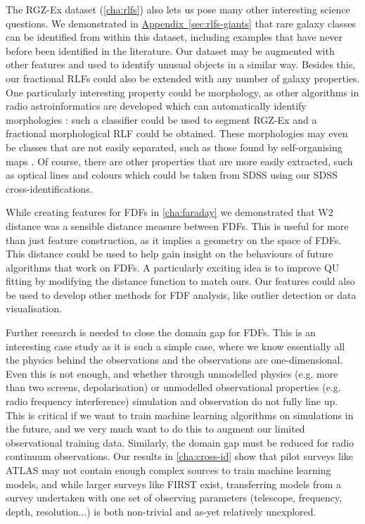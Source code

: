 \documentclass[11pt, a4paper]{book}
\newcommand{\aref}[1]{\hyperref[#1]{Appendix~\ref{#1}}}
\providecommand{\DIFaddbegin}{} %
\providecommand{\DIFaddend}{} %
\providecommand{\DIFdelbegin}{} %
\providecommand{\DIFdelend}{} %
\newcommand{\DIFscaledelfig}{0.5}
\newlength{\DIFdelgraphicswidth} %
\newlength{\DIFdelgraphicsheight} %
\newcommand{\DIFaddincludegraphics}[2][]{{\color{blue}\fbox{\DIFOincludegraphics[#1]{#2}}}} %
\newcommand{\DIFdelincludegraphics}[2][]{%
\sbox{\DIFdelgraphicsbox}{\DIFOincludegraphics[#1]{#2}}%
\settoboxwidth{\DIFdelgraphicswidth}{\DIFdelgraphicsbox} %
\settoboxtotalheight{\DIFdelgraphicsheight}{\DIFdelgraphicsbox} %
\scalebox{\DIFscaledelfig}{%
\parbox[b]{\DIFdelgraphicswidth}{\usebox{\DIFdelgraphicsbox}\\[-\baselineskip] \rule{\DIFdelgraphicswidth}{0em}}\llap{\resizebox{\DIFdelgraphicswidth}{\DIFdelgraphicsheight}{%
\setlength{\unitlength}{\DIFdelgraphicswidth}%
\begin{picture}(1,1)%
\thicklines\linethickness{2pt} %
{\color[rgb]{1,0,0}\put(0,0){\framebox(1,1){}}}%
{\color[rgb]{1,0,0}\put(0,0){\line( 1,1){1}}}%
{\color[rgb]{1,0,0}\put(0,1){\line(1,-1){1}}}%
\end{picture}%
}\hspace*{3pt}}} %
} %
\DeclareRobustCommand{\DIFaddbegin}{\DIFOaddbegin \let\includegraphics\DIFaddincludegraphics} %
\DeclareRobustCommand{\DIFaddend}{\DIFOaddend \let\includegraphics\DIFOincludegraphics} %
\DeclareRobustCommand{\DIFdelbegin}{\DIFOdelbegin \let\includegraphics\DIFdelincludegraphics} %
\DeclareRobustCommand{\DIFdelend}{\DIFOaddend \let\includegraphics\DIFOincludegraphics} %
\begin{document}
    The RGZ-Ex dataset (\autoref{cha:rlfs}) also lets us pose many other interesting science questions. We demonstrated in \DIFdelbegin %
\DIFdelend \DIFaddbegin \aref{sec:rlfs-giants} \DIFaddend that rare galaxy classes can be identified from within this dataset, including examples that have never before been identified in the literature. Our dataset may be augmented with other features and used to identify unusual objects in a similar way. Besides this, our fractional RLFs could also be extended with any number of galaxy properties. One particularly interesting property could be morphology, as other algorithms in radio astroinformatics are developed which can automatically identify morphologies \citep[e.g.][]{wu19claran}: such a classifier could be used to segment RGZ-Ex and a fractional morphological RLF could be obtained. These morphologies may even be classes that are not easily separated, such as those found by self-organising maps \citep[e.g.][]{polsterer15pink}. Of course, there are other properties that are more easily extracted, such as optical lines and colours which could be taken from SDSS using our SDSS cross-identifications.

     While creating features for FDFs in \autoref{cha:faraday} we demonstrated that W2 distance was a sensible distance measure between FDFs. This is useful for more than just feature construction, as it implies a geometry on the space of FDFs. This distance could be used to help gain insight on the behaviours of future algorithms that work on FDFs. A particularly exciting idea is to improve QU fitting by modifying the distance function to match ours. Our features could also be used to develop other methods for FDF analysis, like outlier detection or data visualisation.

     Further research is needed to close the domain gap for FDFs. This is an interesting case study as it is such a simple case, where we know essentially all the physics behind the observations and the observations are one-dimensional. Even this is not enough, and whether through unmodelled physics (e.g. more than two screens, depolarisation) or unmodelled observational properties (e.g. radio frequency interference) simulation and observation do not fully line up. This is critical if we want to train machine learning algorithms on simulations in the future, and we very much want to do this to augment our limited observational training data. Similarly, the domain gap must be reduced for radio continuum observations. Our results in \autoref{cha:cross-id} show that pilot surveys like ATLAS may not contain enough complex sources to train machine learning models, and while larger surveys like FIRST exist, transferring models from a survey undertaken with one set of observing parameters (telescope, frequency, depth, resolution...) is both non-trivial and as-yet relatively unexplored.
\end{document}
